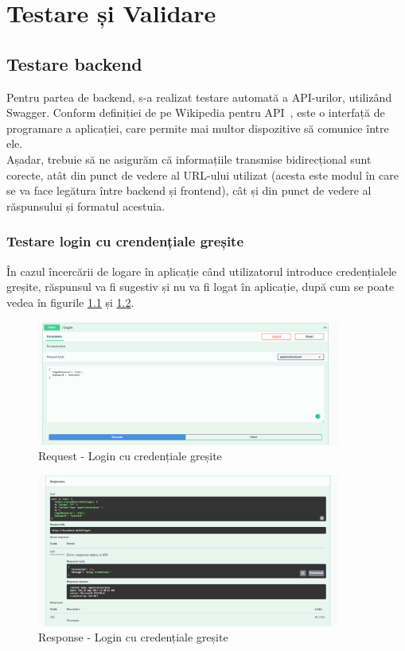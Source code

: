 \chapter{Testare și Validare}
\pagestyle{fancy}

\section{Testare backend}
Pentru partea de backend, s-a realizat testare automată a API-urilor, utilizând Swagger. 
Conform definiției de pe Wikipedia pentru API~\cite{API}, este o interfață de programare a aplicației, care permite mai multor dispozitive să comunice între ele. \\
Așadar, trebuie să ne asigurăm că informațiile transmise bidirecțional sunt corecte, atât din punct de vedere al URL-ului utilizat (acesta este modul în care se va face legătura între backend și frontend), cât și din punct de vedere al răspunsului și formatul acestuia.

\subsection{Testare login cu crendențiale greșite}
În cazul încercării de logare în aplicație când utilizatorul introduce credențialele greșite, răspunsul va fi sugestiv și nu va fi logat în aplicație, după cum se poate vedea în figurile \ref{fig:loginWrong1} și \ref{fig:loginWrong2}.
\begin{figure}[H]
	\centering
	\includegraphics[width=100mm, scale=2]{figs/loginWrong1.png}
    \caption{Request - Login cu credențiale greșite}
	\label{fig:loginWrong1}
\end{figure}

\begin{figure}[H]
	\centering
	\includegraphics[width=100mm, scale=2]{figs/loginWrong2.png}
    \caption{Response - Login cu credențiale greșite}
	\label{fig:loginWrong2}
\end{figure}


